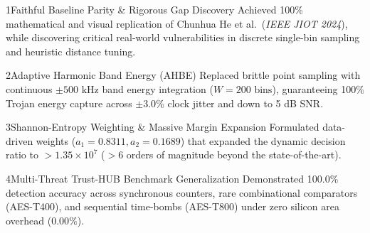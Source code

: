 \documentclass[aspectratio=169,11pt]{beamer}
\begin{document}
\begin{frame}[t]
  \vspace*{-0.18cm}

  \begin{processcardenv}{1}{Faithful Baseline Parity \& Rigorous Gap Discovery}
    Achieved 100\% mathematical and visual replication of Chunhua He et al.\ (\textit{IEEE JIOT 2024}), while discovering critical real-world vulnerabilities in discrete single-bin sampling and heuristic distance tuning.
  \end{processcardenv}
  \vspace{0.03cm}

  \begin{processcardenv}{2}{Adaptive Harmonic Band Energy (AHBE)}
    Replaced brittle point sampling with continuous $\pm 500\text{ kHz}$ band energy integration ($W=200\text{ bins}$), guaranteeing 100\% Trojan energy capture across $\pm 3.0\%$ clock jitter and down to 5 dB SNR.
  \end{processcardenv}
  \vspace{0.03cm}

  \begin{processcardenv}{3}{Shannon-Entropy Weighting \& Massive Margin Expansion}
    Formulated data-driven weights ($a_1=0.8311, a_2=0.1689$) that expanded the dynamic decision ratio to \textbf{$> 1.35 \times 10^7$} ($>6$ orders of magnitude beyond the state-of-the-art).
  \end{processcardenv}
  \vspace{0.03cm}

  \begin{processcardenv}{4}{Multi-Threat Trust-HUB Benchmark Generalization}
    Demonstrated 100.0\% detection accuracy across synchronous counters, rare combinational comparators (AES-T400), and sequential time-bombs (AES-T800) under zero silicon area overhead ($0.00\%$).
  \end{processcardenv}
\end{frame}
\end{document}
